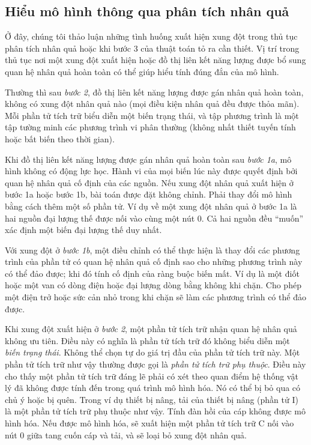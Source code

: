 \subsection{Hiểu mô hình thông qua phân tích nhân quả}
Ở đây, chúng tôi thảo luận những tình huống xuất hiện xung đột trong thủ tục phân tích nhân quả hoặc khi bước 3 của thuật toán tỏ ra cần thiết. Vị trí trong thủ tục nơi một xung đột xuất hiện hoặc đồ thị liên kết năng lượng được bổ sung quan hệ nhân quả hoàn toàn có thể giúp hiểu tính đúng đắn của mô hình.

Thường thì sau \emph{bước 2}, đồ thị liên kết năng lượng được gán nhân quả hoàn toàn, không có xung đột nhân quả nào (mọi điều kiện nhân quả đều được thỏa mãn). Mỗi phần tử tích trữ biểu diễn một biến trạng thái, và tập phương trình là một tập tường minh các phương trình vi phân thường (không nhất thiết tuyến tính hoặc bất biến theo thời gian).

Khi đồ thị liên kết năng lượng được gán nhân quả hoàn toàn sau \emph{bước 1a}, mô hình không có động lực học. Hành vi của mọi biến lúc này được quyết định bởi quan hệ nhân quả cố định của các nguồn. Nếu xung đột nhân quả xuất hiện ở bước 1a hoặc bước 1b, bài toán được đặt không chỉnh. Phải thay đổi mô hình bằng cách thêm một số phần tử. Ví dụ về
một xung đột nhân quả ở bước 1a là hai nguồn đại lượng thế được nối vào cùng một nút 0. Cả hai nguồn đều ``muốn'' xác định một biến đại lượng thế duy nhất.

Với xung đột ở \emph{bước 1b}, một điều chỉnh có thể thực hiện là thay đổi các phương trình của phần tử có quan hệ nhân quả cố định sao cho những phương trình này có thể đảo được; khi đó tính cố định của ràng buộc biến mất. Ví dụ là một điốt hoặc một van có dòng điện hoặc đại lượng dòng bằng không khi chặn. Cho phép một điện trở hoặc sức cản nhỏ trong khi chặn sẽ làm các phương trình có thể đảo được.

Khi xung đột xuất hiện ở \emph{bước 2}, một phần tử tích trữ nhận quan hệ nhân quả không ưu tiên. Điều này có nghĩa là phần tử tích trữ đó không biểu diễn một \emph{biến trạng thái}. Không thể chọn tự do giá trị đầu của phần tử tích trữ này. Một phần tử tích trữ như vậy thường được gọi là \emph{phần tử tích trữ phụ thuộc}. Điều này cho thấy một phần tử tích trữ đáng lẽ phải có xét theo quan điểm hệ thống vật lý đã không được tính đến trong quá trình mô hình hóa. Nó có thể bị bỏ qua có chủ ý hoặc bị quên. Trong ví dụ thiết bị nâng, tải của thiết bị nâng (phần tử I) là một phần tử tích trữ phụ thuộc như vậy. Tính đàn hồi của cáp không được mô hình hóa. Nếu được mô hình hóa, sẽ xuất hiện một phần tử tích trữ C nối vào nút 0 giữa tang cuốn cáp và tải, và sẽ loại bỏ xung đột nhân quả.

